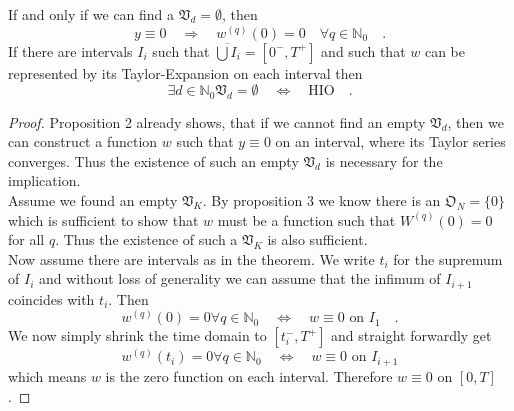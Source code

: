 \begin{theorem}{}{}
	If and only if we can find a $\mathfrak{V}_d = \emptyset$, then
	\begin{equation}
	y\equiv 0 \quad \Rightarrow \quad w^{(q)}(0)=0\quad \forall q\in\mathbb{N}_0 \quad .
	\end{equation}
	If there are intervals $I_i$ such that $\overline{\bigcup I_i}=[0^-,T^+]$ and such that 
	$w$ can be represented by its Taylor-Expansion on each interval then
	\begin{equation}
	\exists d\in\mathbb{N}_0 \mathfrak{V}_d = \emptyset \quad \Longleftrightarrow \quad \text{HIO} \quad .
\end{equation}		
\end{theorem}
\begin{proof}
	Proposition 2 already shows, that if we cannot find an empty $\mathfrak{V}_d$, then we can construct a 
	function $w$ such that $y\equiv 0$ on an interval, where its Taylor series converges. Thus the existence of 
	such an empty $\mathfrak{V}_d$ is necessary for the implication.\\
	 
	Assume we found an empty $\mathfrak{V}_K$. By proposition 3 we know there is an $\mathfrak{O}_N=\{0\}$ 
	which is sufficient to show that $w$ must be a function such that $W^{(q)}(0)=0$ for all $q$. Thus the 
	existence of such a $\mathfrak{V}_K$ is also sufficient. \\
	
	Now assume there are intervals as in the theorem. 
	We write $t_i$ for the supremum of 
	$I_i$ and without loss of generality we can assume that the infimum of $I_{i+1}$ 
	coincides with $t_i$. 
	Then 
	\begin{equation}
	w^{(q)}(0) = 0 \forall q\in\mathbb{N}_0  \quad \Leftrightarrow \quad w\equiv 0 
	\text{ on }I_1 \quad .
	\end{equation}
	We now simply shrink the time domain to $[t_i^-,T^+]$ and straight forwardly get 
	\begin{equation}
	w^{(q)}(t_i) = 0 \forall q\in\mathbb{N}_0  \quad \Leftrightarrow \quad w\equiv 0
	\text{ on } I_{i+1}
	\end{equation}
	which means $w$ is the zero function on each interval. 
	Therefore $w\equiv 0$ on $[0,T]$.
\end{proof}
%
%
